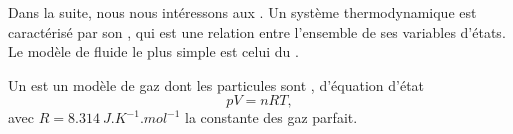 \documentclass[12pt,fancy]{cours}
\begin{document}
Dans la suite, nous nous intéressons aux . Un système thermodynamique est caractérisé par son , qui est une relation entre l’ensemble de ses variables d’états.
Le modèle de fluide le plus simple est celui du .

\begin{definition}\label{def:}
  Un  est un modèle de gaz dont les particules sont , d’équation d’état
  \begin{equation*}
    pV = nRT,
  \end{equation*}
   avec  $R=\SI{8.314}{J.K^{-1}.mol^{-1}}$ la constante des gaz parfait.
  \end{definition}



\end{document}
